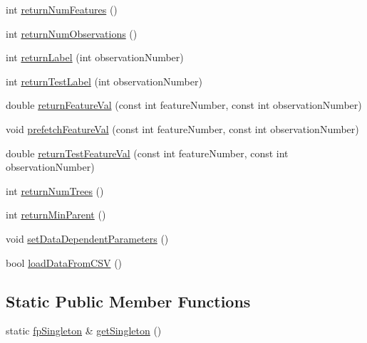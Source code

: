 \begin{DoxyCompactItemize}
\item 
int \hyperlink{classfp_1_1fpSingleton_a97cbcad5ae9daa8c747fd4db84928c20}{return\+Num\+Features} ()
\item 
int \hyperlink{classfp_1_1fpSingleton_ae12f22ad096ff0d419fce47df710bf78}{return\+Num\+Observations} ()
\item 
int \hyperlink{classfp_1_1fpSingleton_aa2f644b1521948fb994f4087ddfaea14}{return\+Label} (int observation\+Number)
\item 
int \hyperlink{classfp_1_1fpSingleton_ac0d2a2fd5ed471c8d507dfd544c12e6d}{return\+Test\+Label} (int observation\+Number)
\item 
double \hyperlink{classfp_1_1fpSingleton_aacc2eb894a219e2fe234743b51fa1a76}{return\+Feature\+Val} (const int feature\+Number, const int observation\+Number)
\item 
void \hyperlink{classfp_1_1fpSingleton_ab789c4e4bfb3248711a5857015008f8d}{prefetch\+Feature\+Val} (const int feature\+Number, const int observation\+Number)
\item 
double \hyperlink{classfp_1_1fpSingleton_ad74b421d65b17ba924244bff31fc9db6}{return\+Test\+Feature\+Val} (const int feature\+Number, const int observation\+Number)
\item 
int \hyperlink{classfp_1_1fpSingleton_a8be36616345b6b77ce4c60b99cc2b91c}{return\+Num\+Trees} ()
\item 
int \hyperlink{classfp_1_1fpSingleton_a2d06406b6462099e0adb393218090420}{return\+Min\+Parent} ()
\item 
void \hyperlink{classfp_1_1fpSingleton_a3edf17209500e72c76ef816e32666eb2}{set\+Data\+Dependent\+Parameters} ()
\item 
bool \hyperlink{classfp_1_1fpSingleton_a12178de58f19494062efe5255d937171}{load\+Data\+From\+C\+SV} ()
\end{DoxyCompactItemize}
\subsection*{Static Public Member Functions}
\begin{DoxyCompactItemize}
\item 
static \hyperlink{classfp_1_1fpSingleton}{fp\+Singleton} \& \hyperlink{classfp_1_1fpSingleton_a8bdae77b68521003e3fc630edec2e240}{get\+Singleton} ()
\end{DoxyCompactItemize}
